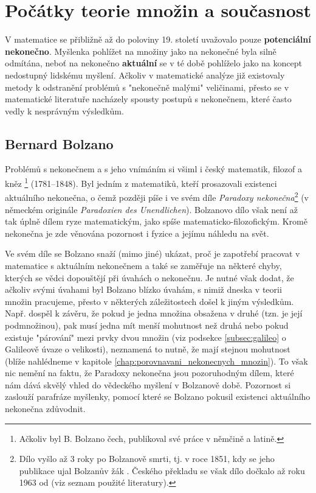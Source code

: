 \section{Počátky teorie množin a současnost}

V matematice se přibližně až do poloviny 19. století uvažovalo pouze \textbf{potenciální nekonečno}. Myšlenka pohlížet na množiny jako na nekonečné byla silně odmítána, neboť na nekonečno \textbf{aktuální} se v té době pohlíželo jako na koncept nedostupný lidskému myšlení. Ačkoliv v matematické analýze již existovaly metody k odstranění problémů s "nekonečně malými" veličinami, přesto se v matematické literatuře nacházely spousty postupů s nekonečnem, které často vedly k nesprávným výsledkům.
\subsection{Bernard Bolzano}\label{subsec:bolzano}
Problémů s nekonečnem a s jeho vnímáním si všiml i český matematik, filozof a kněz \footnote{Ačkoliv byl B. Bolzano čech, publikoval své práce v němčině a latině.} (1781--1848). Byl jedním z matematiků, kteří prosazovali existenci aktuálního nekonečna, o čemž později píše i ve svém díle \emph{Paradoxy nekonečna}\footnote{Dílo vyšlo až 3 roky po Bolzanově smrti, tj. v roce 1851, kdy se jeho publikace ujal Bolzanův žák . Českého překladu se však dílo dočkalo až roku 1963 od  (viz seznam použité literatury).} (v německém originále \emph{Paradoxien des Unendlichen}). Bolzanovo dílo však není až tak úplně dílem ryze matematickým, jako spíše matematicko-filozofickým. Kromě nekonečna je zde věnována pozornost i fyzice a jejímu náhledu na svět.\par
Ve svém díle se Bolzano snaží (mimo jiné) ukázat, proč je zapotřebí pracovat v matematice s aktuálním nekonečnem a také se zaměřuje na některé chyby, kterých se vědci dopouštějí při úvahách o nekonečnu. Je nutné však dodat, že ačkoliv svými úvahami byl Bolzano blízko úvahám, s nimiž dneska v teorii množin pracujeme, přesto v některých záležitostech došel k jiným výsledkům. Např. dospěl k závěru, že pokud je jedna množina obsažena v druhé (tzn. je její podmnožinou), pak musí jedna mít menší mohutnost než druhá nebo pokud existuje "párování" mezi prvky dvou množin (viz podsekce \ref{subsec:galileo}
o Galileově úvaze o velikosti), neznamená to nutně, že mají stejnou mohutnost (blíže nahlédneme v kapitole \ref{chap:porovnavani_nekonecnych_mnozin}). To však nic nemění na faktu, že Paradoxy nekonečna jsou pozoruhodným dílem, které nám dává skvělý vhled do vědeckého myšlení v Bolzanově době. Pozornost si zaslouží parafráze myšlenky, pomocí které se Bolzano pokusil existenci aktuálního nekonečna zdůvodnit.

